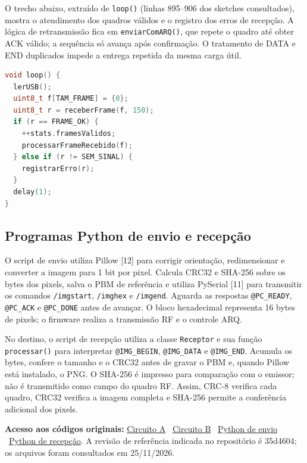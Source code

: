 O trecho abaixo, extraído de \texttt{loop()} (linhas 895--906 dos sketches consultados), mostra o atendimento dos quadros válidos e o registro dos erros de recepção. A lógica de retransmissão fica em \texttt{enviarComARQ()}, que repete o quadro até obter ACK válido; a sequência só avança após confirmação. O tratamento de DATA e END duplicados impede a entrega repetida da mesma carga útil.
\par\noindent\begin{minipage}{\linewidth}
\begin{lstlisting}[language=C++,caption={Trecho original do laço principal do firmware V7},label={lst:loop-v7}]
void loop() {
  lerUSB();
  uint8_t f[TAM_FRAME] = {0};
  uint8_t r = receberFrame(f, 150);
  if (r == FRAME_OK) {
    ++stats.framesValidos;
    processarFrameRecebido(f);
  } else if (r != SEM_SINAL) {
    registrarErro(r);
  }
  delay(1);
}
\end{lstlisting}
\end{minipage}\par

\subsection{Programas Python de envio e recepção}
O script de envio utiliza Pillow [12] para corrigir orientação, redimensionar e converter a imagem para 1 bit por pixel. Calcula CRC32 e SHA-256 sobre os bytes dos pixels, salva o PBM de referência e utiliza PySerial [11] para transmitir os comandos \texttt{/imgstart}, \texttt{/imghex} e \texttt{/imgend}. Aguarda as respostas \texttt{@PC\_READY}, \texttt{@PC\_ACK} e \texttt{@PC\_DONE} antes de avançar. O bloco hexadecimal representa 16 bytes de pixels; o firmware realiza a transmissão RF e o controle ARQ.

No destino, o script de recepção utiliza a classe \texttt{Receptor} e sua função \texttt{processar()} para interpretar \texttt{@IMG\_BEGIN}, \texttt{@IMG\_DATA} e \texttt{@IMG\_END}. Acumula os bytes, confere o tamanho e o CRC32 antes de gravar o PBM e, quando Pillow está instalado, o PNG. O SHA-256 é impresso para comparação com o emissor; não é transmitido como campo do quadro RF. Assim, CRC-8 verifica cada quadro, CRC32 verifica a imagem completa e SHA-256 permite a conferência adicional dos pixels.

\noindent\textbf{Acesso aos códigos originais:} \href{https://github.com/enzogomes2006/tcd-rf433-esp32/blob/35d4604424820aa82c8c3423637b6a23ae0019b2/firmware/CircuitoA/CircuitoA.ino}{Circuito A} \textperiodcentered\ \href{https://github.com/enzogomes2006/tcd-rf433-esp32/blob/35d4604424820aa82c8c3423637b6a23ae0019b2/firmware/CircuitoB/CircuitoB.ino}{Circuito B} \textperiodcentered\ \href{https://github.com/enzogomes2006/tcd-rf433-esp32/blob/35d4604424820aa82c8c3423637b6a23ae0019b2/computador/enviar_imagem_TCD.py}{Python de envio} \textperiodcentered\ \href{https://github.com/enzogomes2006/tcd-rf433-esp32/blob/35d4604424820aa82c8c3423637b6a23ae0019b2/computador/receber_imagem_TCD.py}{Python de recepção}. A revisão de referência indicada no repositório é 35d4604; os arquivos foram consultados em 25/11/2026.

